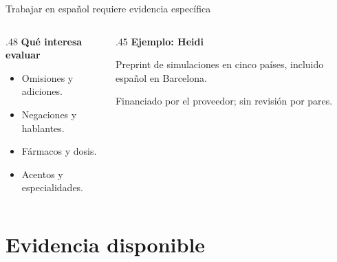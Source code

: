 \documentclass[aspectratio=169,10pt]{beamer}
\begin{document}
\begin{frame}[t]{Trabajar en español requiere evidencia específica}
\begin{columns}[T,onlytextwidth]
\begin{column}{.48\textwidth}
\textbf{Qué interesa evaluar}
\begin{itemize}
\item Omisiones y adiciones.
\item Negaciones y hablantes.
\item Fármacos y dosis.
\item Acentos y especialidades.
\end{itemize}
\end{column}
\begin{column}{.45\textwidth}
\textbf{Ejemplo: Heidi}\par
Preprint de simulaciones en cinco países, incluido español en Barcelona.\par\par\vspace{3mm}
Financiado por el proveedor; sin revisión por pares.
\end{column}
\end{columns}
\end{frame}

\section{Evidencia disponible}
\end{document}
